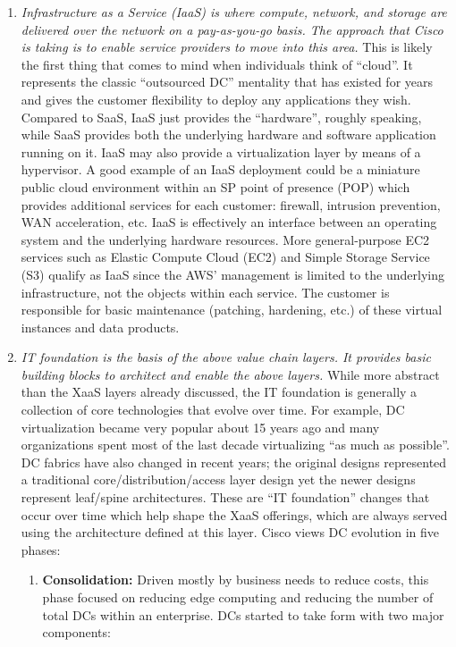 \begin{enumerate}
  \item \textit{Infrastructure as a Service (IaaS) is where compute, network, and
  storage are delivered over the network on a pay-as-you-go basis. The
  approach that Cisco is taking is to enable service providers to move into
  this area.} This is likely the first thing that comes to mind when
  individuals think of ``cloud''. It represents the classic ``outsourced DC''
  mentality that has existed for years and gives the customer flexibility to
  deploy any applications they wish. Compared to SaaS, IaaS just provides the
  ``hardware'', roughly speaking, while SaaS provides both the underlying
  hardware and software application running on it. IaaS may also provide a
  virtualization layer by means of a hypervisor. A good example of an IaaS
  deployment could be a miniature public cloud environment within an SP point
  of presence (POP) which provides additional services for each customer:
  firewall, intrusion prevention, WAN acceleration, etc. IaaS is effectively
  an interface between an operating system and the underlying hardware
  resources. More general-purpose EC2 services such as Elastic Compute Cloud
  (EC2) and Simple Storage Service (S3) qualify as IaaS since the AWS'
  management is limited to the underlying infrastructure, not the objects
  within each service. The customer is responsible for basic maintenance
  (patching, hardening, etc.) of these virtual instances and data products.

  \item \textit{IT foundation is the basis of the above value chain layers. It
  provides basic building blocks to architect and enable the above layers.}
  While more abstract than the XaaS layers already discussed, the IT
  foundation is generally a collection of core technologies that evolve over
  time. For example, DC virtualization became very popular about 15 years ago
  and many organizations spent most of the last decade virtualizing ``as much
  as possible''. DC fabrics have also changed in recent years; the original
  designs represented a traditional core/distribution/access layer design yet
  the newer designs represent leaf/spine architectures. These are ``IT
  foundation'' changes that occur over time which help shape the XaaS
  offerings, which are always served using the architecture defined at this
  layer. Cisco views DC evolution in five phases:

  \begin{enumerate}
    \item \textbf{Consolidation:} Driven mostly by business needs to reduce costs,
	this phase focused on reducing edge computing and reducing the number of
	total DCs within an enterprise. DCs started to take form with two major
	components:


\end{enumerate}
\end{enumerate}
